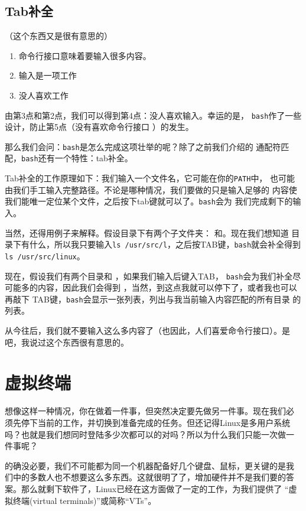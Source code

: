 \subsection{Tab补全}
\label{sec:shell:bash:tabCompletion}
（这个东西又是很有意思的）
\begin{enumerate}
\item 命令行接口意味着要输入很多内容。
\item 输入是一项工作
\item 没人喜欢工作
\end{enumerate}
由第3点和第2点，我们可以得到第4点：没人喜欢输入。幸运的是，
\texttt{bash}作了一些设计，防止第5点（没有喜欢命令行接口 ）的发生。

那么我们会问：\texttt{bash}是怎么完成这项壮举的呢？除了之前我们介绍的
通配符匹配，\texttt{bash}还有一个特性：tab补全。

Tab补全的工作原理如下：我们输入一个文件名，它可能在你的\texttt{PATH}中，
也可能由我们手工输入完整路径。不论是哪种情况，我们要做的只是输入足够的
内容使我们能唯一定位某个文件，之后按下tab键就可以了。\texttt{bash}会为
我们完成剩下的输入。

当然，还得用例子来解释。假设目录下有两个子文件夹：
和。现在我们想知道
目录下有什么，所以我只要输入\texttt{ls
  /usr/src/l}，之后按TAB键，\texttt{bash}就会补全得到\texttt{ls
  /usr/src/linux}。

现在，假设我们有两个目录和
，如果我们输入后键入TAB，
\texttt{bash}会为我们补全尽可能多的内容，因此我们会得到
，当然，到这点我就可以停下了，或者我也可以再敲下
TAB键，\texttt{bash}会显示一张列表，列出与我当前输入内容匹配的所有目录
的列表。

从今往后，我们就不要输入这么多内容了（也因此，人们喜爱命令行接口）。是
吧，我说过这个东西很有意思的。


\section{虚拟终端}
\label{sec:shell:virtualTerminals}
想像这样一种情况，你在做着一件事，但突然决定要先做另一件事。现在我们必
须先停下当前的工作，并切换到准备完成的任务。但还记得Linux是多用户系统
吗？也就是我们想同时登陆多少次都可以的对吗？所以为什么我们只能一次做一
件事呢？

的确没必要，我们不可能都为同一个机器配备好几个键盘、鼠标，更关键的是我
们中的多数人也不想要这么多东西。这就很明了了，增加硬件并不是我们要的答
案。那么就剩下软件了，Linux已经在这方面做了一定的工作，为我们提供了
``虚拟终端(virtual terminals)''或简称``VTs''。

